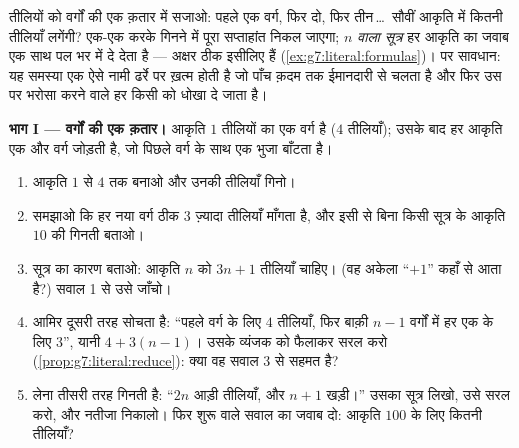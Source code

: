 \begin{problem}
\label{pb:g7:literal:1}
तीलियों को वर्गों की एक क़तार में सजाओ: पहले एक वर्ग, फिर दो, फिर
तीन\,\dots\ सौवीं आकृति में कितनी तीलियाँ लगेंगी? एक-एक करके
गिनने में पूरा सप्ताहांत निकल जाएगा; \emph{$n$ वाला सूत्र} हर
आकृति का जवाब एक साथ पल भर में दे देता है --- अक्षर ठीक इसीलिए हैं
(\cref{ex:g7:literal:formulas})। पर सावधान: यह समस्या एक ऐसे नामी
ढर्रे पर ख़त्म होती है जो पाँच क़दम तक ईमानदारी से चलता है और फिर
उस पर भरोसा करने वाले हर किसी को धोखा दे जाता है।

\medskip
\noindent\textbf{भाग I --- वर्गों की एक क़तार।}
आकृति $1$ तीलियों का एक वर्ग है ($4$ तीलियाँ); उसके बाद हर आकृति
एक और वर्ग जोड़ती है, जो पिछले वर्ग के साथ एक भुजा बाँटता है।
\begin{enumerate}
  \item आकृति $1$ से $4$ तक बनाओ और उनकी तीलियाँ गिनो।
  \item समझाओ कि हर नया वर्ग ठीक $3$ ज़्यादा तीलियाँ माँगता है,
        और इसी से बिना किसी सूत्र के आकृति $10$ की गिनती बताओ।
  \item सूत्र का कारण बताओ: आकृति $n$ को $3n + 1$ तीलियाँ चाहिए।
        (वह अकेला ``$+1$'' कहाँ से आता है?) सवाल 1 से उसे जाँचो।
  \item आमिर दूसरी तरह सोचता है: ``पहले वर्ग के लिए $4$ तीलियाँ,
        फिर बाक़ी $n - 1$ वर्गों में हर एक के लिए $3$'', यानी
        $4 + 3(n - 1)$। उसके व्यंजक को फैलाकर सरल करो
        (\cref{prop:g7:literal:reduce}): क्या वह सवाल 3 से सहमत
        है?
  \item लेना तीसरी तरह गिनती है: ``$2n$ आड़ी तीलियाँ, और $n + 1$
        खड़ी।'' उसका सूत्र लिखो, उसे सरल करो, और नतीजा निकालो।
        फिर शुरू वाले सवाल का जवाब दो: आकृति $100$ के लिए कितनी
        तीलियाँ?
\end{enumerate}


\end{problem}
